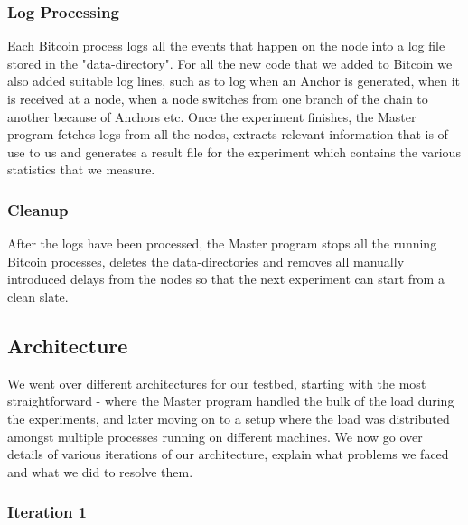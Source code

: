 \subsubsection{Log Processing}

Each Bitcoin process logs all the events that happen on the node into a log file stored in the "data-directory".
For all the new code that we added to Bitcoin we also added suitable log lines, such as to log when an Anchor is generated, when it is received at a node, when a node switches from one branch of the chain to another because of Anchors etc.
Once the experiment finishes, the Master program fetches logs from all the nodes, extracts relevant information that is of use to us and generates a result file for the experiment which contains the various statistics that we measure. 

\subsubsection{Cleanup}

After the logs have been processed, the Master program stops all the running Bitcoin processes, deletes the data-directories and removes all manually introduced delays from the nodes so that the next experiment can start from a clean slate.



\newpage
\subsection{Architecture} \label{impl-testbed-arch}

We went over different architectures for our testbed, starting with the most straightforward - where the Master program handled the bulk of the load during the experiments, and later moving on to a setup where the load was distributed amongst multiple processes running on different machines. We now go over details of various iterations of our architecture, explain what problems we faced and what we did to resolve them.

\subsubsection{Iteration 1} \label{impl-arch-1}

